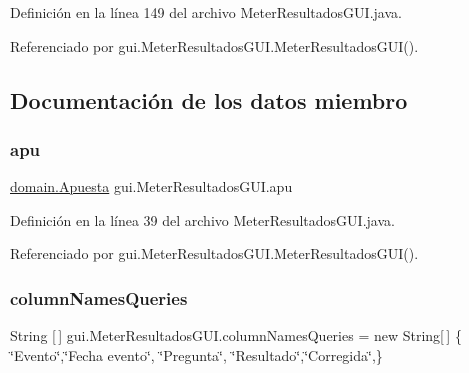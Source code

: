 Definición en la línea 149 del archivo Meter\+Resultados\+G\+U\+I.\+java.


\begin{DoxyCode}{0}

\end{DoxyCode}


Referenciado por gui.\+Meter\+Resultados\+G\+U\+I.\+Meter\+Resultados\+G\+U\+I().



\subsection{Documentación de los datos miembro}
\mbox{\label{classgui_1_1MeterResultadosGUI_acf472c1e18849ac7970bd55052a927b6}} 
\subsubsection{\texorpdfstring{apu}{apu}}
{\footnotesize\ttfamily \mbox{\hyperlink{classdomain_1_1Apuesta}{domain.\+Apuesta}} gui.\+Meter\+Resultados\+G\+U\+I.\+apu\hspace{0.3cm}{\ttfamily [private]}}



Definición en la línea 39 del archivo Meter\+Resultados\+G\+U\+I.\+java.



Referenciado por gui.\+Meter\+Resultados\+G\+U\+I.\+Meter\+Resultados\+G\+U\+I().

\mbox{\label{classgui_1_1MeterResultadosGUI_a627fb2fd35893e8742ee7db4723cfd97}} 
\subsubsection{\texorpdfstring{columnNamesQueries}{columnNamesQueries}}
{\footnotesize\ttfamily String \mbox{[}$\,$\mbox{]} gui.\+Meter\+Resultados\+G\+U\+I.\+column\+Names\+Queries = new String\mbox{[}$\,$\mbox{]} \{ \char`\"{}Evento\char`\"{},\char`\"{}Fecha evento\char`\"{}, \char`\"{}Pregunta\char`\"{}, \char`\"{}Resultado\char`\"{},\char`\"{}Corregida\char`\"{},\}\hspace{0.3cm}{\ttfamily [private]}}



